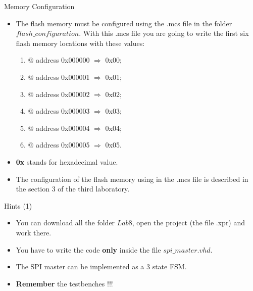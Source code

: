 \documentclass[ignorenonframetext,aspectratio=43,]{beamer}
\begin{document}
\begin{frame}{Memory Configuration}
\protect\hypertarget{memory-configuration}{}

\begin{itemize}
\item
  The flash memory must be configured using the .mcs file in the folder
  \(flash\_configuration\). With this .mcs file you are going to write
  the first six flash memory locations with these values:

  \begin{enumerate}
  \item
    @ address 0x000000 \(\Rightarrow\) 0x00;
  \item
    @ address 0x000001 \(\Rightarrow\) 0x01;
  \item
    @ address 0x000002 \(\Rightarrow\) 0x02;
  \item
    @ address 0x000003 \(\Rightarrow\) 0x03;
  \item
    @ address 0x000004 \(\Rightarrow\) 0x04;
  \item
    @ address 0x000005 \(\Rightarrow\) 0x05.
  \end{enumerate}
\item
  \textbf{0x} stands for hexadecimal value.
\item
  The configuration of the flash memory using in the .mcs file is
  described in the section 3 of the third laboratory.
\end{itemize}

\end{frame}

\begin{frame}{Hints (1)}
\protect\hypertarget{hints-1}{}

\begin{itemize}
\item
  You can download all the folder \(Lab8\), open the project (the file
  .xpr) and work there.
\item
  You have to write the code \textbf{only} inside the file
  \(spi\_master.vhd\).
\item
  The SPI master can be implemented as a 3 state FSM.
\item
  \textbf{Remember} the testbenches !!!
\end{itemize}

\end{frame}
\end{document}
